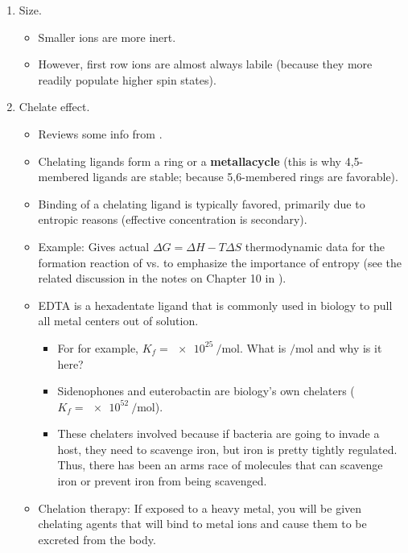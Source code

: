 \documentclass[../notes.tex]{subfiles}
\begin{document}
\begin{itemize}
\begin{enumerate}
\begin{itemize}
        \end{itemize}
        \item Size.
        \begin{itemize}
            \item Smaller ions are more inert.
            \item However, first row ions are almost always labile (because they more readily populate higher spin states).
        \end{itemize}
        \item Chelate effect.
        \begin{itemize}
            \item Reviews some info from \textcite{bib:CHEM20100Notes}.
            \item Chelating ligands form a ring or a \textbf{metallacycle} (this is why 4,5-membered ligands are stable; because 5,6-membered rings are favorable).
            \item Binding of a chelating ligand is typically favored, primarily due to entropic reasons (effective concentration is secondary).
            \item Example: Gives actual $\Delta G=\Delta H-T\Delta S$ thermodynamic data for the formation reaction of  vs.  to emphasize the importance of entropy (see the related discussion in the notes on Chapter 10 in \textcite{bib:CHEM20100Notes}).
            \item EDTA is a hexadentate ligand that is commonly used in biology to pull all metal centers out of solution.
            \begin{itemize}
                \item For  for example, $K_f=\SI{e25}{\per\mole}$. What is $\si{\per\mole}$ and why is it here?
                \item Sidenophones and euterobactin are biology's own chelaters ($K_f=\SI{e52}{\per\mole}$).
                \item These chelaters involved because if bacteria are going to invade a host, they need to scavenge iron, but iron is pretty tightly regulated. Thus, there has been an arms race of molecules that can scavenge iron or prevent iron from being scavenged.
            \end{itemize}
            \item Chelation therapy: If exposed to a heavy metal, you will be given chelating agents that will bind to metal ions and cause them to be excreted from the body.
        \end{itemize}

\end{enumerate}
\end{itemize}
\end{document}
